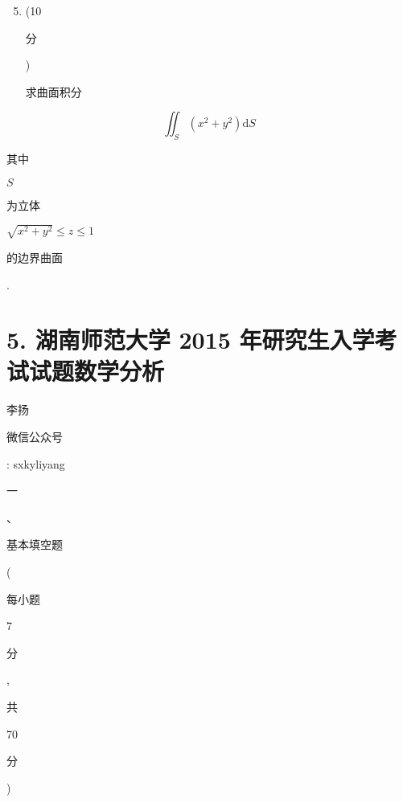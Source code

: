 \documentclass[10pt]{article}
\begin{document}
\begin{enumerate}
  \setcounter{enumi}{4}
  \item (10 \begin{CJK}{UTF8}{mj}分\end{CJK}) \begin{CJK}{UTF8}{mj}求曲面积分\end{CJK}
\end{enumerate}
$$
\iint_{S}\left(x^{2}+y^{2}\right) \mathrm{d} S
$$
\begin{CJK}{UTF8}{mj}其中\end{CJK} $S$ \begin{CJK}{UTF8}{mj}为立体\end{CJK} $\sqrt{x^{2}+y^{2}} \leqslant z \leqslant 1$ \begin{CJK}{UTF8}{mj}的边界曲面\end{CJK}.

\section{5. 湖南师范大学 2015 年研究生入学考试试题数学分析}
\begin{CJK}{UTF8}{mj}李扬\end{CJK}

\begin{CJK}{UTF8}{mj}微信公众号\end{CJK}: sxkyliyang

\begin{CJK}{UTF8}{mj}一\end{CJK}、\begin{CJK}{UTF8}{mj}基本填空题\end{CJK}(\begin{CJK}{UTF8}{mj}每小题\end{CJK} 7 \begin{CJK}{UTF8}{mj}分\end{CJK}, \begin{CJK}{UTF8}{mj}共\end{CJK} 70 \begin{CJK}{UTF8}{mj}分\end{CJK})
\end{document}
